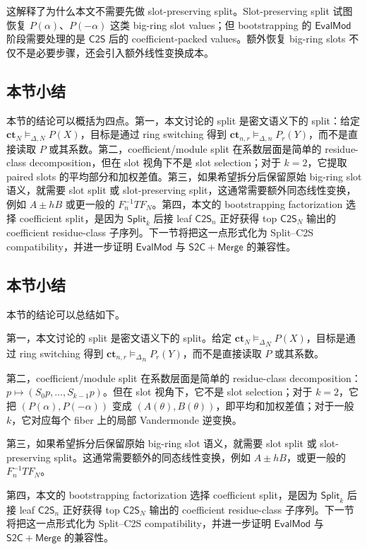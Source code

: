 \documentclass[UTF8,11pt]{article}
\newcommand{\Split}{\mathsf{Split}}
\newcommand{\Merge}{\mathsf{Merge}}
\newcommand{\CtwoS}{\mathsf{C2S}}
\newcommand{\StwoC}{\mathsf{S2C}}
\newcommand{\EvalMod}{\mathsf{EvalMod}}
\newcommand{\ct}{\mathbf{ct}}
\newcommand{\rep}{\mathrel{\vDash_{\Delta}}}
\theoremstyle{definition}
\theoremstyle{plain}
\begin{document}
这解释了为什么本文不需要先做 slot-preserving split。Slot-preserving split 试图恢复 \(P(\alpha)\)、\(P(-\alpha)\) 这类 big-ring slot values；但 bootstrapping 的 \(\EvalMod\) 阶段需要处理的是 \(\CtwoS\) 后的 coefficient-packed values。额外恢复 big-ring slots 不仅不是必要步骤，还会引入额外线性变换成本。

\subsection{本节小结}
\label{subsec:coeff-slot-summary}

本节的结论可以概括为四点。第一，本文讨论的 split 是密文语义下的 split：给定 \(\ct_N\vDash_{\Delta,N}P(X)\)，目标是通过 ring switching 得到 \(\ct_{n,r}\vDash_{\Delta,n}P_r(Y)\)，而不是直接读取 \(P\) 或其系数。第二，coefficient/module split 在系数层面是简单的 residue-class decomposition，但在 slot 视角下不是 slot selection；对于 \(k=2\)，它提取 paired slots 的平均部分和加权差值。第三，如果希望拆分后保留原始 big-ring slot 语义，就需要 slot split 或 slot-preserving split，这通常需要额外同态线性变换，例如 \(A\pm hB\) 或更一般的 \(F_n^{-1}TF_N\)。第四，本文的 bootstrapping factorization 选择 coefficient split，是因为 \(\Split_k\) 后接 leaf \(\CtwoS_n\) 正好获得 top \(\CtwoS_N\) 输出的 coefficient residue-class 子序列。下一节将把这一点形式化为 Split--C2S compatibility，并进一步证明 \(\EvalMod\) 与 \(\StwoC+\Merge\) 的兼容性。

\subsection{本节小结}
\label{subsec:coeff-slot-summary}

本节的结论可以总结如下。

第一，本文讨论的 split 是密文语义下的 split。给定 \(\ct_N\rep_N P(X)\)，目标是通过 ring switching 得到 \(\ct_{n,r}\rep_n P_r(Y)\)，而不是直接读取 \(P\) 或其系数。

第二，coefficient/module split 在系数层面是简单的 residue-class decomposition：\(p\mapsto(S_0p,\ldots,S_{k-1}p)\)。但在 slot 视角下，它不是 slot selection；对于 \(k=2\)，它把 \((P(\alpha),P(-\alpha))\) 变成 \((A(\theta),B(\theta))\)，即平均和加权差值；对于一般 \(k\)，它对应每个 fiber 上的局部 Vandermonde 逆变换。

第三，如果希望拆分后保留原始 big-ring slot 语义，就需要 slot split 或 slot-preserving split。这通常需要额外的同态线性变换，例如 \(A\pm hB\)，或更一般的 \(F_n^{-1}TF_N\)。

第四，本文的 bootstrapping factorization 选择 coefficient split，是因为 \(\Split_k\) 后接 leaf \(\CtwoS_n\) 正好获得 top \(\CtwoS_N\) 输出的 coefficient residue-class 子序列。下一节将把这一点形式化为 Split--C2S compatibility，并进一步证明 \(\EvalMod\) 与 \(\StwoC+\Merge\) 的兼容性。
\end{document}
